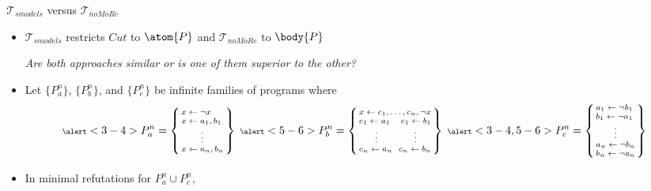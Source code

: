 \begin{frame}{${\mathcal{T}}_{\textit{smodels}}$ versus ${\mathcal{T}}_{\textit{noMoRe}}$}
  \begin{itemize}
  \item<1-> \alert<8>{${\mathcal{T}}_{\textit{smodels}}$} restricts $\textit{Cut}$ to $\atom{P}$ and \alert<7>{${\mathcal{T}}_{\textit{noMoRe}}$} to $\body{P}$

    \alert<1>{\em Are both approaches similar or is one of them superior to the other?}
    \medskip
  \item<2-> Let $\{P^n_a\}$, $\{P^n_b\}$, and $\{P^n_c\}$ be infinite families of programs where
    \[\scriptsize\hspace{-3pt}
    \alert<3-4>{P^n_a} =
    \left\{
      \begin{array}{@{\,}l@{\,}}
        x \leftarrow \neg x      \\
        x \leftarrow a_1, b_1     \\
        \multicolumn{1}{c}{\vdots}\\
        x \leftarrow a_n, b_n
      \end{array}
    \right\}
    \
    \alert<5-6>{P^n_b} =
    \left\{
      \begin{array}{@{\,}l@{\ }c@{\ }r@{\,}}
        \multicolumn{3}{@{\,}l@{\,}}{x \leftarrow c_1,\dots,c_n,\neg x}   \\
        c_1 \leftarrow a_1                                                 &&
        c_1 \leftarrow b_1                                                 \\
        \multicolumn{1}{c}{\vdots}                                         &&
        \multicolumn{1}{c}{\vdots}                                         \\
        c_n \leftarrow a_n                                                 &&
        c_n \leftarrow b_n
      \end{array}
    \right\}
    \
    \alert<3-4,5-6>{P_c^n} =
    \left\{
      \begin{array}{@{\,}l@{\,}}
        a_1 \leftarrow \neg b_1  \\
        b_1 \leftarrow \neg a_1  \\
        \multicolumn{1}{c}{\vdots}\\
        a_n \leftarrow \neg b_n  \\
        b_n \leftarrow \neg a_n
      \end{array}
    \right\}
    \]
  \item <3->
    In \alert<3>{minimal refutations} for \alert<3>{$P^n_a\cup P^n_c$},

\end{itemize}
\end{frame}
